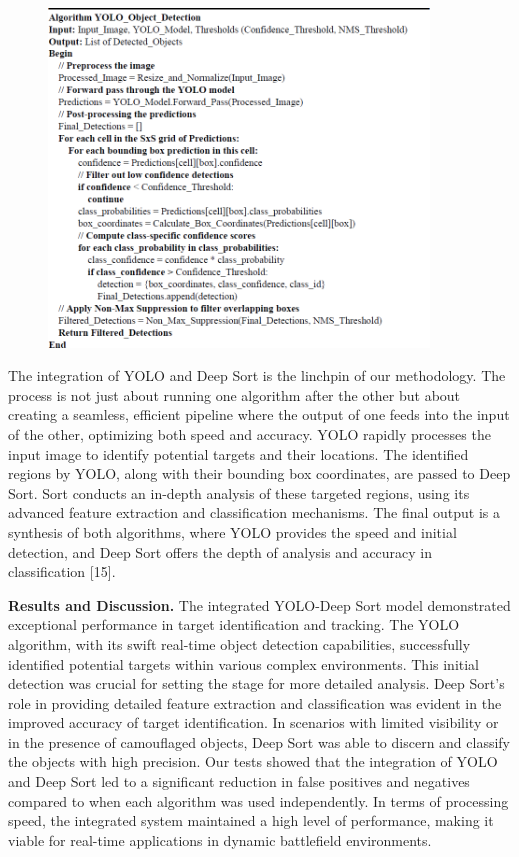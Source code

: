 \begin{figure}[H]
	\centering
	\includegraphics[width=0.9\textwidth]{assets/16}
	\caption*{}
\end{figure}

\begin{multicols}{2}
The integration of YOLO and Deep Sort is the linchpin of our
methodology. The process is not just about running one algorithm after
the other but about creating a seamless, efficient pipeline where the
output of one feeds into the input of the other, optimizing both speed
and accuracy. YOLO rapidly processes the input image to identify
potential targets and their locations. The identified regions by YOLO,
along with their bounding box coordinates, are passed to Deep Sort. Sort
conducts an in-depth analysis of these targeted regions, using its
advanced feature extraction and classification mechanisms. The final
output is a synthesis of both algorithms, where YOLO provides the speed
and initial detection, and Deep Sort offers the depth of analysis and
accuracy in classification {[}15{]}.

{\bfseries Results and Discussion.} The integrated YOLO-Deep Sort model
demonstrated exceptional performance in target identification and
tracking. The YOLO algorithm, with its swift real-time object detection
capabilities, successfully identified potential targets within various
complex environments. This initial detection was crucial for setting the
stage for more detailed analysis. Deep Sort's role in providing detailed
feature extraction and classification was evident in the improved
accuracy of target identification. In scenarios with limited visibility
or in the presence of camouflaged objects, Deep Sort was able to discern
and classify the objects with high precision. Our tests showed that the
integration of YOLO and Deep Sort led to a significant reduction in
false positives and negatives compared to when each algorithm was used
independently. In terms of processing speed, the integrated system
maintained a high level of performance, making it viable for real-time
applications in dynamic battlefield environments.
\end{multicols}

